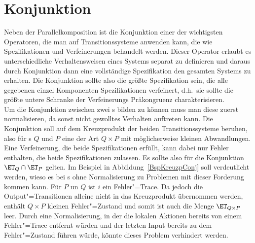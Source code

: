 \section{Konjunktion}

Neben der Parallelkomposition ist die Konjunktion einer der wichtigsten
Operatoren, die man auf Transitionssysteme anwenden kann, die wie
Spezifikationen und Verfeinerungen behandelt werden. Dieser Operator erlaubt es
unterschiedliche Verhaltensweisen eines Systems separat zu definieren und
daraus durch Konjunktion dann eine vollständige Spezifikation den gesamten
Systems zu erhalten. Die Konjunktion sollte also die größte Spezifikation sein,
die alle gegebenen einzel Komponenten Spezifikationen verfeinert, d.h.\ sie
sollte die größte untere Schranke der Verfeinerungs Präkongruenz
charakterisieren.\\
Um die Konjunktion zwischen zwei \MEIO{}s bilden zu können muss man diese
zuerst normalisieren, da sonst nicht gewolltes Verhalten auftreten kann. Die
Konjunktion soll auf dem Kreuzprodukt der beiden Transitionssysteme beruhen,
also für \MEIO{}s $Q$ und $P$ eine \MEIO{} der Art $Q\times P$ mit
möglicherweise kleinen Abwandlungen. Eine Verfeinerung, die beide
Spezifikationen erfüllt, kann dabei nur Fehler enthalten, die beide
Spezifikationen zulassen. Es sollte also für die Konjunktion $\ET _Q\cap \ET
_P$ gelten. Im Beispiel in Abbildung~\ref{BspKreuzpConj} soll verdeutlicht
werden, wieso es bei \MEIO{}s ohne Normalisierung zu Problemen mit dieser
Forderung kommen kann. Für $P$ un $Q$ ist $i$ ein Fehler"=Trace. Da jedoch die
Output"=Transitionen alleine nicht in das Kreuzprodukt übernommen werden,
enthält $Q\times P$ kleinen Fehler"=Zustand und somit ist auch die Menge $\ET
_{Q\times P}$ leer. Durch eine Normalisierung, in der die lokalen Aktionen
bereits von einem Fehler"=Trace entfernt würden und der letzten Input bereits
zu dem Fehler"=Zustand führen würde, könnte dieses Problem verhindert werden.

